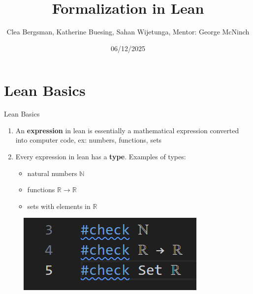 \documentclass[xcolor=dvipsnames]{beamer}
\title{Formalization in Lean}
\date{06/12/2025}
\author{Clea Bergsman, Katherine Buesing, 
Sahan Wijetunga, Mentor: George McNinch}
\institute[Formalization in Lean]{VERSEIM REU}
\newcommand{\N}{\mathbb{N}}
\newcommand{\R}{\mathbb{R}}
\begin{document}
	
	
	\begin{frame}
		\titlepage
	\end{frame}
	
	
	\begin{frame}
		\tableofcontents
	\end{frame}
	


\section{Lean Basics}

\begin{frame}{Lean Basics}

\begin{enumerate}
   \item An \textbf{expression} in lean is essentially a mathematical expression converted into computer code, ex: numbers, functions, sets

   \item Every expression in lean has a \textbf{type}. Examples of types:
   \begin{itemize}
        \item natural numbers $\N$
        \item functions $\R \to \R$
        \item sets with elements in $\R$
   \end{itemize}

   



    
\end{enumerate}
    \begin{figure}
        \centering
        \includegraphics[width=0.5\linewidth]{basic_type_checks.png}
    \end{figure}
        
\end{frame}
\end{document}
